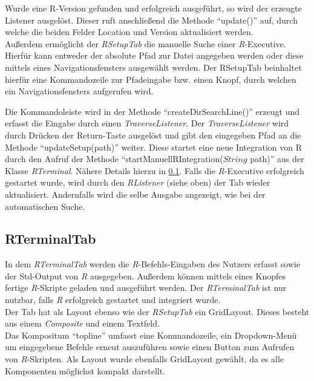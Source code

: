 \documentclass[a4paper, 12pt]{report} %
\begin{document}
Wurde eine R-Version gefunden und erfolgreich ausgeführt, so wird der erzeugte Listener ausgelöst. Dieser ruft anschließend die Methode "`update()"' auf, durch welche die beiden Felder Location und Version aktualisiert werden.\\

Außerdem ermöglicht der \textit{RSetupTab} die manuelle Suche einer \textit{R}-Executive. Hierfür kann entweder der absolute Pfad zur Datei angegeben werden oder diese mittels eines Navigationsfensters ausgewählt werden.
Der RSetupTab beinhaltet hierfür eine Kommandozeile zur Pfadeingabe bzw. einen Knopf, durch welchen ein Navigationsfensters aufgerufen wird.

Die Kommandoleiste wird in der Methode "`createDirSearchLine()"' erzeugt und erfasst die Eingabe durch einen \textit{TraverseListener}. Der \textit{TraverseListener} wird durch Drücken der Return-Taste ausgelöst und gibt den eingegeben Pfad an die Methode "`updateSetup(path)"' weiter. Diese startet eine neue Integration von R durch den Aufruf der Methode "`startManuellRIntegration($String$ path)"' aus der Klasse \textit{RTerminal}. Nähere Details hierzu in \ref{RTerminal}. Falls die \textit{R}-Executive erfolgreich gestartet wurde, wird durch den \textit{RListener} (siehe oben) der Tab wieder aktualisiert. Andernfalls wird die selbe Ausgabe angezeigt, wie bei der automatischen Suche.

\subsection{RTerminalTab} \label{RTerminal}

In dem \textit{RTerminalTab} werden die \textit{R}-Befehls-Eingaben des Nutzers erfasst sowie der Std-Output von \textit{R} ausgegeben. Außerdem können mittels eines Knopfes fertige \textit{R}-Skripte geladen und ausgeführt werden. Der \textit{RTerminalTab} ist nur nutzbar, falls \textit{R} erfolgreich gestartet und integriert wurde.\\

Der Tab hat als Layout ebenso wie der \textit{RSetupTab} ein GridLayout.
Dieses besteht aus einem \textit{Composite} und einem Textfeld.\\

Das Kompositum "`topline"' umfasst eine Kommandozeile, ein Dropdown-Menü um eingegebene Befehle erneut auszuführen sowie einen Button zum Aufrufen von \textit{R}-Skripten. Als Layout wurde ebenfalls GridLayout gewählt, da es alle Komponenten möglichst kompakt darstellt.
\end{document}
